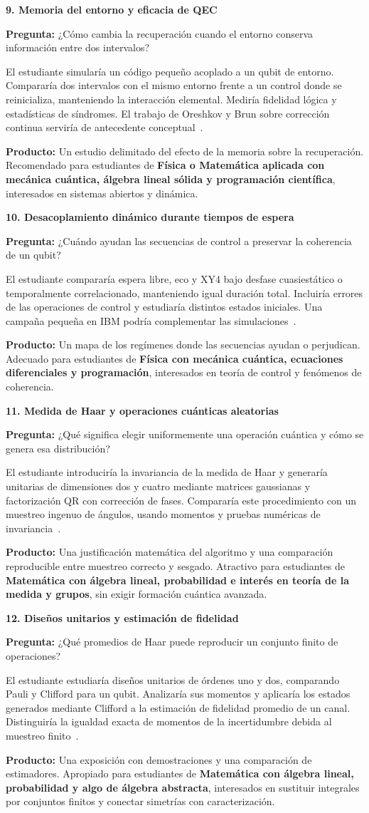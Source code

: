 \documentclass[11pt,a4paper]{article}
\newcommand{\tema}[5]{%
\noindent\begin{minipage}{\linewidth}\raggedright
\textbf{#1. #2}\par
\textbf{Pregunta:} #3\par
#4\par
\textbf{Producto:} #5
\end{minipage}\par\vspace{9pt}}
\begin{document}
\tema{9}{Memoria del entorno y eficacia de QEC}
{¿Cómo cambia la recuperación cuando el entorno conserva información entre dos intervalos?}
{El estudiante simularía un código pequeño acoplado a un qubit de entorno. Compararía dos intervalos con el mismo entorno frente a un control donde se reinicializa, manteniendo la interacción elemental. Mediría fidelidad lógica y estadísticas de síndromes. El trabajo de Oreshkov y Brun sobre corrección continua serviría de antecedente conceptual~\cite{memory}.}
{Un estudio delimitado del efecto de la memoria sobre la recuperación. Recomendado para estudiantes de \textbf{Física o Matemática aplicada con mecánica cuántica, álgebra lineal sólida y programación científica}, interesados en sistemas abiertos y dinámica.}

\tema{10}{Desacoplamiento dinámico durante tiempos de espera}
{¿Cuándo ayudan las secuencias de control a preservar la coherencia de un qubit?}
{El estudiante compararía espera libre, eco y XY4 bajo desfase cuasiestático o temporalmente correlacionado, manteniendo igual duración total. Incluiría errores de las operaciones de control y estudiaría distintos estados iniciales. Una campaña pequeña en IBM podría complementar las simulaciones~\cite{dd}.}
{Un mapa de los regímenes donde las secuencias ayudan o perjudican. Adecuado para estudiantes de \textbf{Física con mecánica cuántica, ecuaciones diferenciales y programación}, interesados en teoría de control y fenómenos de coherencia.}

\tema{11}{Medida de Haar y operaciones cuánticas aleatorias}
{¿Qué significa elegir uniformemente una operación cuántica y cómo se genera esa distribución?}
{El estudiante introduciría la invariancia de la medida de Haar y generaría unitarias de dimensiones dos y cuatro mediante matrices gaussianas y factorización QR con corrección de fases. Compararía este procedimiento con un muestreo ingenuo de ángulos, usando momentos y pruebas numéricas de invariancia~\cite{haar}.}
{Una justificación matemática del algoritmo y una comparación reproducible entre muestreo correcto y sesgado. Atractivo para estudiantes de \textbf{Matemática con álgebra lineal, probabilidad e interés en teoría de la medida y grupos}, sin exigir formación cuántica avanzada.}

\tema{12}{Diseños unitarios y estimación de fidelidad}
{¿Qué promedios de Haar puede reproducir un conjunto finito de operaciones?}
{El estudiante estudiaría diseños unitarios de órdenes uno y dos, comparando Pauli y Clifford para un qubit. Analizaría sus momentos y aplicaría los estados generados mediante Clifford a la estimación de fidelidad promedio de un canal. Distinguiría la igualdad exacta de momentos de la incertidumbre debida al muestreo finito~\cite{designs}.}
{Una exposición con demostraciones y una comparación de estimadores. Apropiado para estudiantes de \textbf{Matemática con álgebra lineal, probabilidad y algo de álgebra abstracta}, interesados en sustituir integrales por conjuntos finitos y conectar simetrías con caracterización.}
\end{document}
